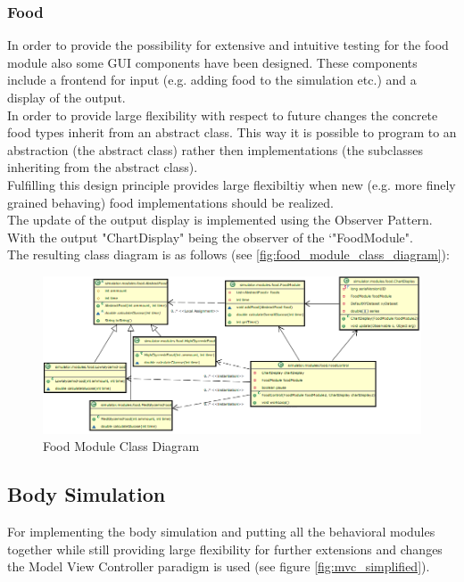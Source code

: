 \documentclass[pdflatex,a4paper,11pt,english]{scrreprt}
\begin{document}
\subsubsection{Food}
In order to provide the possibility for extensive and intuitive testing for the
food module also some GUI components have been designed. These components include a frontend for input (e.g. adding food to the simulation etc.) and a display of the output. \\
In order to provide large flexibility with respect to future changes the
concrete food types inherit from an abstract class. This way it is possible to
program to an abstraction (the abstract class) rather then implementations (the
subclasses inheriting from the abstract class). \\
Fulfilling this design principle provides large flexibiltiy when new (e.g. more
finely grained behaving) food implementations should be realized.\\
The update of the output display is implemented using the Observer Pattern.
With the output "ChartDisplay" being the observer of the `"FoodModule".
\\
The resulting class diagram is as follows (see
\vref{fig:food_module_class_diagram}):

\begin{figure}[htb]
\centering
\includegraphics[width=\textwidth]{images/food_module_class_diagram2}
\caption{Food Module Class Diagram}
\label{fig:food_module_class_diagram}
\end{figure}


\newpage
\subsection{Body Simulation}
\label{sec:body_simulation}
For implementing the body simulation and putting all the behavioral modules
together while still providing large flexibility for further extensions and
changes the Model View Controller paradigm is used (see figure
\vref{fig:mvc_simplified}). 
\end{document}
